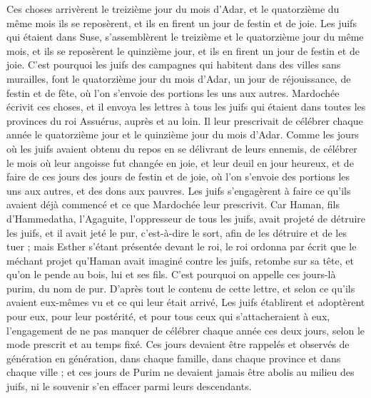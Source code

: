 \begin{multicols}{2}
Ces choses arrivèrent le treizième jour du mois d'Adar, et le quatorzième du même mois ils se reposèrent, et ils en firent un jour de festin et de joie.
Les juifs qui étaient dans Suse, s'assemblèrent le treizième et le quatorzième jour du même mois, et ils se reposèrent le quinzième jour, et ils en firent un jour de festin et de joie.
C'est pourquoi les juifs des campagnes qui habitent dans des villes sans murailles, font le quatorzième jour du mois d'Adar, un jour de réjouissance, de festin et de fête, où l’on s’envoie des portions les uns aux autres.
Mardochée écrivit ces choses, et il envoya les lettres à tous les juifs qui étaient dans toutes les provinces du roi Assuérus, auprès et au loin.
Il leur prescrivait de célébrer chaque année le quatorzième jour et le quinzième jour du mois d'Adar.
Comme les jours où les juifs avaient obtenu du repos en se délivrant de leurs ennemis, de célébrer le mois où leur angoisse fut changée en joie, et leur deuil en jour heureux, et de faire de ces jours des jours de festin et de joie, où l’on s’envoie des portions les uns aux autres, et des dons aux pauvres.
Les juifs s’engagèrent à faire ce qu’ils avaient déjà commencé et ce que Mardochée leur prescrivit.
Car Haman, fils d'Hammedatha, l’Agaguite, l'oppresseur de tous les juifs, avait projeté de détruire les juifs, et il avait jeté le pur, c'est-à-dire le sort, afin de les détruire et de les tuer ;
mais Esther s’étant présentée devant le roi, le roi ordonna par écrit que le méchant projet qu'Haman avait imaginé contre les juifs, retombe sur sa tête, et qu'on le pende au bois, lui et ses fils.
C'est pourquoi on appelle ces jours-là purim, du nom de pur. D’après tout le contenu de cette lettre, et selon ce qu’ils avaient eux-mêmes vu et ce qui leur était arrivé,
Les juifs établirent et adoptèrent pour eux, pour leur postérité, et pour tous ceux qui s’attacheraient à eux, l’engagement de ne pas manquer de célébrer chaque année ces deux jours, selon le mode prescrit et au temps fixé.
Ces jours devaient être rappelés et observés de génération en génération, dans chaque famille, dans chaque province et dans chaque ville ; et ces jours de Purim ne devaient jamais être abolis au milieu des juifs, ni le souvenir s’en effacer parmi leurs descendants.

\end{multicols}
